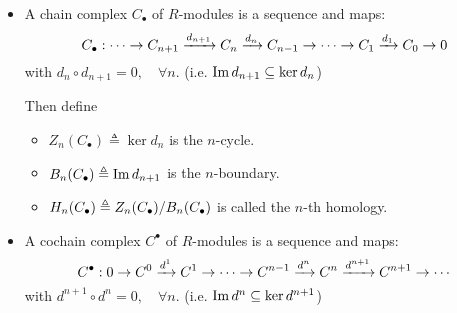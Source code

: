\begin{definition} \mbox{}
  \begin{itemize}
    \item A chain complex $C_\bullet$ of $R$-modules is a sequence and maps:
      \[
        C_\bullet : \dotsm \to C_{n+1} \xrightarrow{d_{n+1}} C_n \xrightarrow{d_n} C_{n-1}
        \to \dotsm \to C_1 \xrightarrow{d_1} C_0 \to 0
      \]
      with $d_n \circ d_{n+1} = 0, \quad \forall n$.
      (i.e. $\operatorname{Im} d_{n+1} \subseteq \ker d_n$)

      Then define
      \begin{itemize}
        \item $Z_n(C_\bullet) \triangleq \ker d_n$ is the $n$-cycle.
        \item $B_n(C_\bullet) \triangleq \operatorname{Im} d_{n+1}$ is the $n$-boundary.
        \item $H_n(C_\bullet) \triangleq {Z_n(C_\bullet)}/{B_n(C_\bullet)}$
          is called the $n$-th homology.
      \end{itemize}
    \item A cochain complex $C^\bullet$ of $R$-modules is a sequence and maps:
      \[
        C^\bullet : 0 \to C^0 \xrightarrow{d^1} C^1 \to \dotsm \to
        C^{n-1} \xrightarrow{d^n} C^n \xrightarrow{d^{n+1}} C^{n+1} \to \dotsm
      \]
      with $d^{n+1} \circ d^n = 0, \quad \forall n$.
      (i.e. $\operatorname{Im} d^n \subseteq \ker d^{n+1}$)


\end{itemize}
\end{definition}
